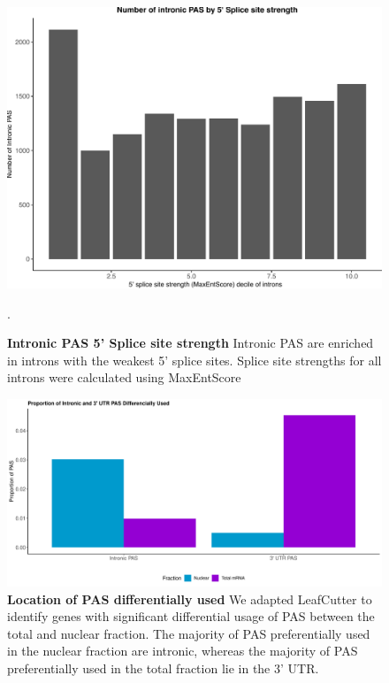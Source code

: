 \begin{figure}[!htb]
\centering \includegraphics[width=5in]{img/ch02/Fig1_figuresupplement4.pdf}
\caption[Intronic PAS 5' Splice site strength]{\textbf{Intronic PAS 5' Splice site strength} Intronic PAS are enriched in introns with the weakest 5' splice sites. Splice site strengths for all introns were calculated using MaxEntScore \citep{yeo_maximum_2004}}.
\label{fig:splicesite}
\end{figure}
\clearpage

\begin{figure}[!htb]
\centering \includegraphics[width=5in]{img/ch02/Fig1_figuresupplement5.pdf}
\caption[Location of PAS differentially used]{\textbf{Location of PAS differentially used} We adapted LeafCutter to identify genes with significant differential usage of PAS between the total and nuclear fraction. The majority of PAS preferentially used in the nuclear fraction are intronic, whereas the majority of PAS preferentially used in the total fraction lie in the 3' UTR. }
\label{fig:locdPAS}
\end{figure}
\clearpage



